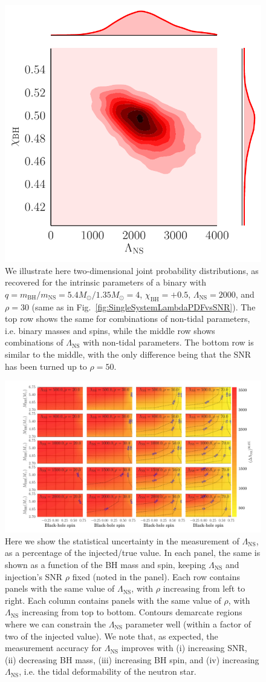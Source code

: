 \documentclass[aps,prd,amsmath,floats,floatfix, twocolumn,
superscriptaddress,nofootinbib,showpacs]{revtex4-1}
\newcommand{\lambdans}{\Lambda_\mathrm{NS}}
\newcommand{\chibh}{\chi_\mathrm{BH}}
\newcommand{\mbh}{m_\mathrm{BH}}
\newcommand{\mns}{m_\mathrm{NS}}
\begin{document}
\begin{figure}
\includegraphics[width=0.47\columnwidth]{plots/LambdaChiBH2D_q4_mc2_25_chi0_50_snr50}
\caption{%
We illustrate here two-dimensional joint probability distributions, as
recovered for the intrinsic parameters of a binary with
$q = \mbh/\mns = 5.4M_\odot/1.35M_\odot = 4$, $\chibh=+0.5$,
$\lambdans=2000$, and $\rho=30$ (same as in
Fig.~\ref{fig:SingleSystemLambdaPDFvsSNR}).
The top row shows the same for combinations of 
non-tidal parameters, i.e. binary masses and spins, while the middle row 
shows combinations of $\lambdans$ with non-tidal parameters. The bottom row
is similar to the middle, with the only difference being that the SNR has been
turned up to $\rho=50$.
}
\label{fig:SingleSystemLambda2DPDFs}
\end{figure}
\begin{figure}
\centering    
\includegraphics[trim={2cm 0 0 0},width=2.2\columnwidth]{plots/TTLambdaRawCIWidths90_0_Lambda_SNR}
\caption{Here we show the statistical uncertainty in the measurement of
$\lambdans$, as a percentage of the injected/true value. In each panel, the
same is shown as a function of the BH mass and spin, keeping $\lambdans$ and
injection's SNR $\rho$ fixed (noted in the panel). Each row contains panels
with the same value of $\lambdans$, with $\rho$ increasing from left to right.
Each column contains panels with the same value of $\rho$, with $\lambdans$ 
increasing from top to bottom.
% 
Contours demarcate regions where we can constrain the
$\lambdans$ parameter well (within a factor of two of the injected value).
% 
We note that, as expected, the measurement accuracy for $\lambdans$ improves with (i) increasing
SNR, (ii) decreasing BH mass, (iii) increasing BH spin, and 
(iv) increasing $\lambdans$, i.e. the tidal deformability of the neutron star.
}
\label{fig:TT_LambdaCIWidths90_0_Lambda_SNR}
\end{figure}
\end{document}
